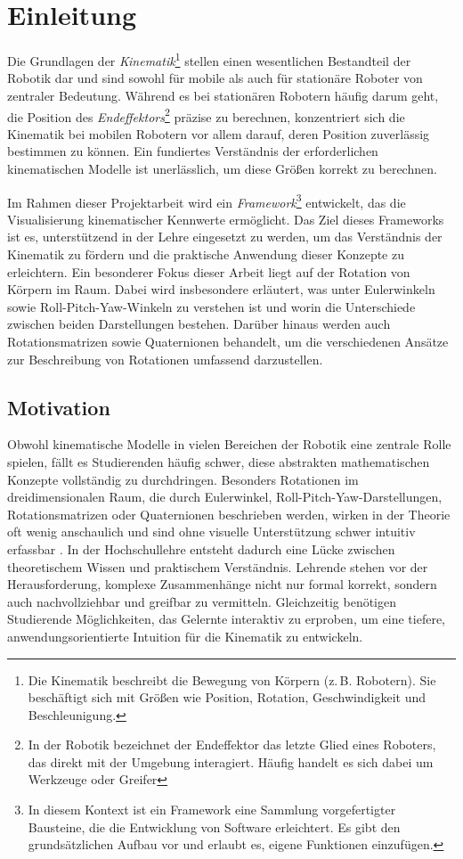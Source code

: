 \section{Einleitung}

Die Grundlagen der \textit{Kinematik}\footnote{Die Kinematik beschreibt die Bewegung von Körpern (z.\,B. Robotern). Sie beschäftigt sich mit Größen wie Position, Rotation, Geschwindigkeit und Beschleunigung.}
stellen einen wesentlichen Bestandteil der Robotik dar und sind sowohl für mobile als auch für stationäre Roboter von zentraler Bedeutung.
Während es bei stationären Robotern häufig darum geht, die Position des \textit{Endeffektors}\footnote{In der Robotik bezeichnet der Endeffektor das letzte Glied eines Roboters, das direkt mit der Umgebung interagiert. Häufig handelt es sich dabei um Werkzeuge oder Greifer} präzise zu berechnen,
konzentriert sich die Kinematik bei mobilen Robotern vor allem darauf, deren Position zuverlässig bestimmen zu können.
Ein fundiertes Verständnis der erforderlichen kinematischen Modelle ist unerlässlich, um diese Größen korrekt zu berechnen.

Im Rahmen dieser Projektarbeit wird ein \textit{Framework}\footnote{In diesem Kontext ist ein Framework eine Sammlung vorgefertigter Bausteine, die die Entwicklung von Software erleichtert.
Es gibt den grundsätzlichen Aufbau vor und erlaubt es, eigene Funktionen einzufügen.} entwickelt, das die Visualisierung kinematischer Kennwerte ermöglicht.
Das Ziel dieses Frameworks ist es, unterstützend in der Lehre eingesetzt zu werden, um das Verständnis der Kinematik zu fördern und die praktische Anwendung dieser Konzepte zu erleichtern.
Ein besonderer Fokus dieser Arbeit liegt auf der Rotation von Körpern im Raum. Dabei wird insbesondere erläutert,
was unter Eulerwinkeln sowie Roll-Pitch-Yaw-Winkeln zu verstehen ist und worin die Unterschiede zwischen beiden Darstellungen bestehen.
Darüber hinaus werden auch Rotationsmatrizen sowie Quaternionen behandelt, um die verschiedenen Ansätze zur Beschreibung von Rotationen umfassend darzustellen.


\subsection{Motivation}
Obwohl kinematische Modelle in vielen Bereichen der Robotik eine zentrale Rolle spielen, fällt es Studierenden häufig schwer,
diese abstrakten mathematischen Konzepte vollständig zu durchdringen. Besonders Rotationen im dreidimensionalen Raum, die durch Eulerwinkel,
Roll-Pitch-Yaw-Darstellungen, Rotationsmatrizen oder Quaternionen beschrieben werden, wirken in der Theorie oft wenig anschaulich und sind ohne visuelle
Unterstützung schwer intuitiv erfassbar .
In der Hochschullehre entsteht dadurch eine Lücke zwischen theoretischem Wissen und praktischem Verständnis.
Lehrende stehen vor der Herausforderung, komplexe Zusammenhänge nicht nur formal korrekt, sondern auch nachvollziehbar und greifbar zu vermitteln.
Gleichzeitig benötigen Studierende Möglichkeiten, das Gelernte interaktiv zu erproben, um eine tiefere, anwendungsorientierte Intuition für die Kinematik zu entwickeln.

